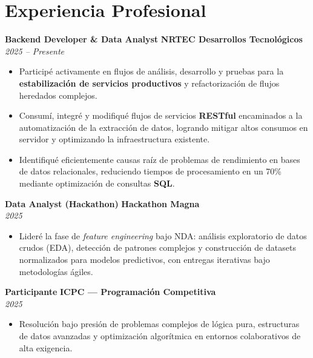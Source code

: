 \documentclass[10pt,a4paper]{article}
\begin{document}
\section{Experiencia Profesional}

\noindent\textbf{Backend Developer \& Data Analyst} \hfill \textbf{NRTEC Desarrollos Tecnológicos} \\
\textit{2025 -- Presente}
\begin{itemize}[leftmargin=*,nosep,after=\vspace{0.05em},itemsep=0pt]
  \item Participé activamente en flujos de análisis, desarrollo y pruebas para la \textbf{estabilización de servicios productivos} y refactorización de flujos heredados complejos.
  \item Consumí, integré y modifiqué flujos de servicios \textbf{RESTful} encaminados a la automatización de la extracción de datos, logrando mitigar altos consumos en servidor y optimizando la infraestructura existente.
  \item Identifiqué eficientemente causas raíz de problemas de rendimiento en bases de datos relacionales, reduciendo tiempos de procesamiento en un 70\% mediante optimización de consultas \textbf{SQL}.
\end{itemize}

\noindent\textbf{Data Analyst (Hackathon)} \hfill \textbf{Hackathon Magna} \\
\textit{2025}
\begin{itemize}[leftmargin=*,nosep,after=\vspace{0.05em},itemsep=0pt]
  \item Lideré la fase de \textit{feature engineering} bajo NDA: análisis exploratorio de datos crudos (EDA), detección de patrones complejos y construcción de datasets normalizados para modelos predictivos, con entregas iterativas bajo metodologías ágiles.
\end{itemize}

\noindent\textbf{Participante} \hfill \textbf{ICPC — Programación Competitiva} \\
\textit{2025}
\begin{itemize}[leftmargin=*,nosep,after=\vspace{0.05em},itemsep=0pt]
  \item Resolución bajo presión de problemas complejos de lógica pura, estructuras de datos avanzadas y optimización algorítmica en entornos colaborativos de alta exigencia.
\end{itemize}
\end{document}
